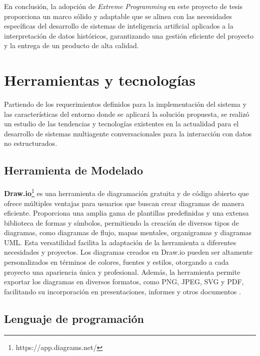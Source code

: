 En conclusión, la adopción de \textit{Extreme Programming} en este proyecto de tesis proporciona un marco sólido y adaptable que se alinea con las necesidades específicas del desarrollo de sistemas de inteligencia artificial aplicados a la interpretación de datos históricos, garantizando una gestión eficiente del proyecto y la entrega de un producto de alta calidad.

\section{Herramientas y tecnologías}

Partiendo de los requerimientos definidos para la implementación del sistema y las características del entorno donde se aplicará la solución propuesta, se realizó un estudio de las tendencias y tecnologías existentes en la actualidad para el desarrollo de sistemas multiagente conversacionales para la interacción con datos no estructurados.

\subsection{Herramienta de Modelado}

\textbf{Draw.io}\footnote{https://app.diagrams.net/} es una herramienta de diagramación gratuita y de código abierto que ofrece múltiples ventajas para usuarios que buscan crear diagramas de manera eficiente. Proporciona una amplia gama de plantillas predefinidas y una extensa biblioteca de formas y símbolos, permitiendo la creación de diversos tipos de diagramas, como diagramas de flujo, mapas mentales, organigramas y diagramas UML. Esta versatilidad facilita la adaptación de la herramienta a diferentes necesidades y proyectos. Los diagramas creados en Draw.io pueden ser altamente personalizados en términos de colores, fuentes y estilos, otorgando a cada proyecto una apariencia única y profesional. Además, la herramienta permite exportar los diagramas en diversos formatos, como PNG, JPEG, SVG y PDF, facilitando su incorporación en presentaciones, informes y otros documentos \cite{drawio}.

\subsection{Lenguaje de programación}


